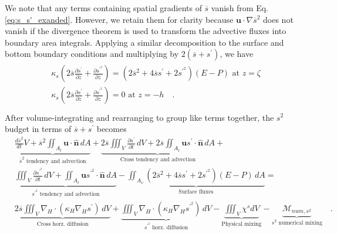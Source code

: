 We note that any terms containing spatial gradients of $\overline{s}$ vanish from Eq. \ref{eq:s_s'_exanded}. However, we retain them for clarity because $\mathbf{u} \cdot \nabla \overline{s}^2$ does not vanish if the divergence theorem is used to transform the advective fluxes into boundary area integrals. Applying a similar decomposition to the surface and bottom boundary conditions and multiplying by $2(\overline{s}+s^\prime)$,  we have
\begin{align} \label{eq:salt_bcs_sprime_expanded}
\begin{split}
    &  \kappa_s \left(2\overline{s} \frac{\partial s^\prime}{\partial z}+\frac{\partial s^{\prime^2}}{\partial z}\right) = \left(2\overline{s}^2+4 \overline{s} s^\prime+2s^{\prime^2} \right)(E-P) \,\, \textrm{at} \,\, z = \zeta \\
    &  \kappa_s \left(2\overline{s} \frac{\partial s^\prime}{\partial z} +\frac{\partial s^{\prime^2}}{\partial z}\right) = 0 \,\, \textrm{at} \,\, z = -h \quad . \\
\end{split}
\end{align}
After volume-integrating and rearranging to group like terms together, the $s^2$ budget in terms of $\overline{s}+s^\prime$ becomes
\begin{equation} \label{eq:differences_vint}
    \begin{split}
        & \underbrace{\frac{d \overline{s}^2}{d t} V + \overline{s}^2 \iint_{A_l} \mathbf{u} \cdot \hat{\mathbf{n}} \, dA}_\text{$\overline{s}^2$ tendency and advection}+ \underbrace{2\overline{s} \iiint_V \frac{\partial s^\prime}{\partial t} \, dV+2\overline{s}\iint_{A_l} \mathbf{u}s^{\prime} \cdot \hat{\mathbf{n}} \, dA}_\text{Cross tendency and advection} + \\
        & \underbrace{\iiint_V \frac{\partial s^{\prime^2}}{\partial t} \, dV+\iint_{A_l}  \mathbf{u}s^{\prime^2} \cdot \hat{\mathbf{n}} \, dA}_\text{$s^{\prime^2}$ tendency and advection}-\underbrace{\iint_{A_{v}} \left(2\overline{s}^2+4 \overline{s} s^\prime+2s^{\prime^2} \right)(E-P) \, dA}_\text{Surface fluxes} = \\ 
        & 
        \underbrace{2 \overline{s} \iiint_{V} \nabla_H \cdot \left(\kappa_H \nabla_H s^{\prime} \right) \, dV}_{\text{Cross horz. diffusion}}+
        \underbrace{\iiint_{V} \nabla_H \cdot \left(\kappa_H \nabla_H s^{\prime^2} \right) \, dV}_{\text{$s^{\prime^2}$ horz. diffusion}}-\underbrace{\iiint_V \chi^s dV}_\text{Physical mixing} - \underbrace{\mathcal{M}_{num, s^2}}_\text{$s^2$ numerical mixing} \quad . 
\end{split}
\end{equation}
